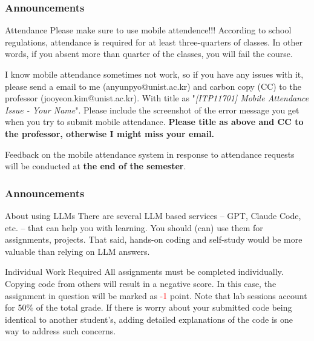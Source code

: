\begin{frame}
    \frametitle{Announcements}

    \begin{alertblock}{Attendance}
        Please make sure to use mobile attendence!!! According to school regulations, attendance is required for at least three-quarters of classes. In other words, if you absent more than quarter of the classes, you will fail the course. 
    \end{alertblock}

    I know mobile attendance sometimes not work, so if you have any issues with it, please send a email to me (anyunpyo@unist.ac.kr) and carbon copy (CC) to the professor (jooyeon.kim@unist.ac.kr). With title as "\textit{[ITP11701] Mobile Attendance Issue - Your Name}". Please include the screenshot of the error message you get when you try to submit mobile attendance. \textbf{Please title as above and CC to the professor, otherwise I might miss your email.}

    Feedback on the mobile attendance system in response to attendance requests will be conducted at \textbf{the end of the semester}.
\end{frame}

\begin{frame}
    \frametitle{Announcements}

    \begin{block}{About using LLMs}
        There are several LLM based services -- GPT, Claude Code, etc. -- that can help you with learning. You should (can) use them for assignments, projects. That said, hands-on coding and self-study would be more valuable than relying on LLM answers.
    \end{block}

    \begin{alertblock}{Individual Work Required}
        All assignments must be completed individually. Copying code from others will result in a negative score. In this case, the assignment in question will be marked as \textcolor{red}{-1} point. Note that lab sessions account for 50\% of the total grade. If there is worry about your submitted code being identical to another student's, adding detailed explanations of the code is one way to address such concerns.
    \end{alertblock}
\end{frame}

